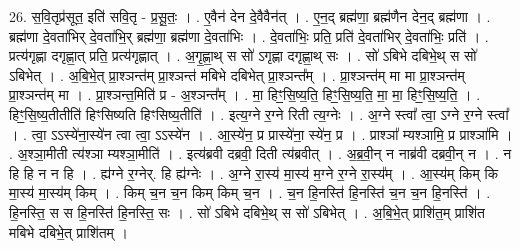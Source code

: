 \documentclass[17pt]{extarticle}
\begin{document}
26. स॒वि॒तृप्र॑सूत॒ इति॑ सवि॒तृ - प्र॒सू॒तः॒ । . ए॒वैन॑ देन दे॒वैवैन॑त् । . ए॒न॒द् ब्रह्म॑णा॒ ब्रह्म॑णैन देन॒द् ब्रह्म॑णा । . ब्रह्म॑णा दे॒वता॑भिर् दे॒वता॑भि॒र् ब्रह्म॑णा॒ ब्रह्म॑णा दे॒वता॑भिः । . दे॒वता॑भिः॒ प्रति॒ प्रति॑ दे॒वता॑भिर् दे॒वता॑भिः॒ प्रति॑ । . प्रत्य॑गृह्णा दगृह्णा॒त् प्रति॒ प्रत्य॑गृह्णात् । . अ॒गृ॒ह्णा॒थ् स सो॑ ऽगृह्णा दगृह्णा॒थ् सः । . सो॑ ऽबिभे दबिभे॒थ् स सो॑ ऽबिभेत् । . अ॒बि॒भे॒त् प्रा॒श्ञन्त॑म् प्रा॒श्ञन्त॑ मबिभे दबिभेत् प्रा॒श्ञन्त᳚म् । . प्रा॒श्ञन्त॑म् मा मा प्रा॒श्ञन्त॑म् प्रा॒श्ञन्त॑म् मा । . प्रा॒श्ञन्त॒मिति॑ प्र - अ॒श्ञन्त᳚म् । . मा॒ हिꣳ॒॒सि॒ष्य॒ति॒ हिꣳ॒॒सि॒ष्य॒ति॒ मा॒ मा॒ हिꣳ॒॒सि॒ष्य॒ति॒ । . हिꣳ॒॒सि॒ष्य॒तीतीति॑ हिꣳसिष्यति हिꣳसिष्य॒तीति॑ । . इत्य॒ग्ने र॒ग्ने रिती त्य॒ग्नेः । . अ॒ग्ने स्त्वा᳚ त्वा॒ ऽग्ने र॒ग्ने स्त्वा᳚ । . त्वा॒ ऽऽस्ये॑ना॒स्ये॑न त्वा त्वा॒ ऽऽस्ये॑न । . आ॒स्ये॑न॒ प्र प्रास्ये॑ना॒ स्ये॑न॒ प्र । . प्राश्ञा᳚ म्यश्ञामि॒ प्र प्राश्ञा॑मि । . अ॒श्ञा॒मीती त्य॑श्ञा म्यश्ञा॒मीति॑ । . इत्य॑ब्रवी दब्रवी॒ दिती त्य॑ब्रवीत् । . अ॒ब्र॒वी॒न् न नाब्र॑वी दब्रवी॒न् न । . न हि हि न न हि । . ह्य॑ग्ने र॒ग्नेर्. हि ह्य॑ग्नेः । . अ॒ग्ने रा॒स्य॑ मा॒स्य॑ म॒ग्ने र॒ग्ने रा॒स्य᳚म् । . आ॒स्य॑म् किम् कि मा॒स्य॑ मा॒स्य॑म् किम् । . किम् च॒न च॒न किम् किम् च॒न । . च॒न हि॒नस्ति॑ हि॒नस्ति॑ च॒न च॒न हि॒नस्ति॑ । . हि॒नस्ति॒ स स हि॒नस्ति॑ हि॒नस्ति॒ सः । . सो॑ ऽबिभे दबिभे॒थ् स सो॑ ऽबिभेत् । . अ॒बि॒भे॒त् प्राशि॑त॒म् प्राशि॑त मबिभे दबिभे॒त् प्राशि॑तम् । \newline
\end{document}
